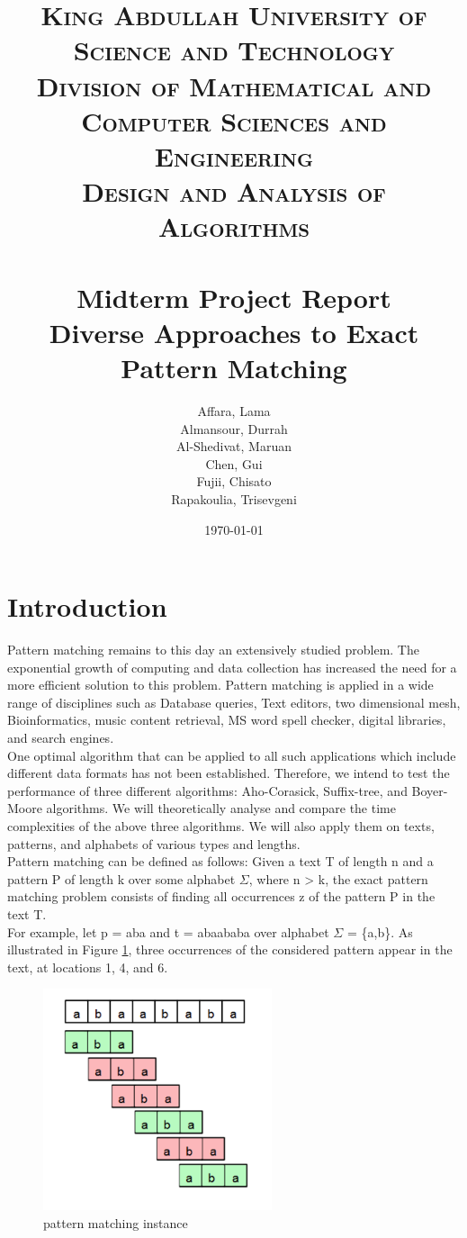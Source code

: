 \documentclass[paper=a4, fontsize=11pt]{scrartcl} %
\title{
\normalfont \normalsize
\textsc{King Abdullah University of Science and Technology\\
        Division of Mathematical and Computer Sciences and Engineering\\
        Design and Analysis of Algorithms} \\ [25pt] %
\horrule{0.5pt} \\[0.4cm] %
\Large Midterm Project Report\\
\huge Diverse Approaches to Exact Pattern Matching
\horrule{2pt} \\[0.5cm] %
}
\author{Affara, Lama\\
        Almansour, Durrah\\
        Al-Shedivat, Maruan\\
        Chen, Gui\\
        Fujii, Chisato\\
        Rapakoulia, Trisevgeni}
\date{\normalsize\today} %
\numberwithin{equation}{section} %
\numberwithin{figure}{section} %
\numberwithin{table}{section} %
\begin{document}
\begin{titlepage}
\maketitle
\thispagestyle{empty}
\clearpage
\end{titlepage}

\section{Introduction}
Pattern matching remains to this day an extensively studied problem. The exponential growth of computing and data collection has increased the need for a more efficient solution to this problem. Pattern matching is applied in a wide range of disciplines such as Database queries, Text editors, two dimensional mesh, Bioinformatics, music content retrieval, MS word spell checker, digital libraries, and search engines.\\

One optimal algorithm that can be applied to all such applications which include different data formats has not been established. Therefore, we intend to test the performance of three different algorithms: Aho-Corasick, Suffix-tree, and Boyer-Moore algorithms. We will theoretically analyse and compare the time complexities of the above three algorithms. We will also apply them on texts, patterns, and alphabets of various types and lengths.\\

Pattern matching can be defined as follows\cite{intro}: Given a text T of length n and a pattern P of length k over some alphabet $\Sigma$, where n > k, the exact pattern matching problem consists of finding all occurrences z of the pattern P in the text T.\\

For example, let p = aba and t = abaababa over alphabet $\Sigma$ = \{a,b\}. As illustrated in Figure \ref{matching}, three occurrences of the considered pattern appear in the text, at locations 1, 4, and 6.

\begin{figure}[h!]
\centering
\includegraphics[width=0.6\textwidth]{figures/matching.png}
\caption{pattern matching instance}
\label{matching}
\end{figure}
\end{document}
